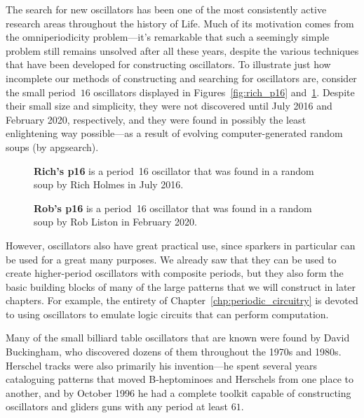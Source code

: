 The search for new oscillators has been one of the most consistently active research areas throughout the history of Life. Much of its motivation comes from the omniperiodicity problem---it's remarkable that such a seemingly simple problem still remains unsolved after all these years, despite the various techniques that have been developed for constructing oscillators. To illustrate just how incomplete our methods of constructing and searching for oscillators are, consider the small period~$16$ oscillators displayed in Figures~\ref{fig:rich_p16} and~\ref{fig:rob_p16}. Despite their small size and simplicity, they were not discovered until July 2016 and February 2020, respectively, and they were found in possibly the least enlightening way possible---as a result of evolving computer-generated random soups (by apgsearch).

\begin{figure}[!htb]
	\centering
	\begin{minipage}[b]{.48\textwidth}
		\centering
		\caption{\textbf{Rich's p16} is a period~16 oscillator that was found in a random soup by Rich Holmes in July 2016.}\label{fig:rich_p16}
	\end{minipage} \hfill %
	\begin{minipage}[b]{.48\textwidth}
		\centering
		\caption{\textbf{Rob's p16} is a period~16 oscillator that was found in a random soup by Rob Liston in February 2020.}\label{fig:rob_p16}
	\end{minipage}
\end{figure}

However, oscillators also have great practical use, since sparkers in particular can be used for a great many purposes. We already saw that they can be used to create higher-period oscillators with composite periods, but they also form the basic building blocks of many of the large patterns that we will construct in later chapters. For example, the entirety of Chapter~\ref{chp:periodic_circuitry} is devoted to using oscillators to emulate logic circuits that can perform computation.

Many of the small billiard table oscillators that are known were found by David Buckingham, who discovered dozens of them throughout the 1970s and 1980s. Herschel tracks were also primarily his invention---he spent several years cataloguing patterns that moved B-heptominoes and Herschels from one place to another, and by October 1996 he had a complete toolkit capable of constructing oscillators and gliders guns with any period at least $61$.

